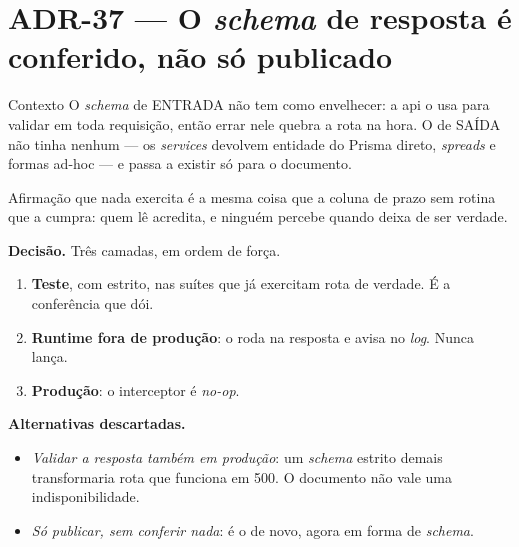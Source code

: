 \section{ADR-37 --- O \emph{schema} de resposta é conferido, não só publicado}
\label{adr:contrato-de-resposta}

\begin{especificacao}{Contexto}
O \emph{schema} de ENTRADA não tem como envelhecer: a api o usa para validar em
toda requisição, então errar nele quebra a rota na hora. O de SAÍDA não tinha
nenhum --- os \emph{services} devolvem entidade do Prisma direto, \emph{spreads}
e formas ad-hoc --- e passa a existir só para o documento.

Afirmação que nada exercita é a mesma coisa que a coluna de prazo sem rotina que
a cumpra: quem lê acredita, e ninguém percebe quando deixa de ser verdade.
\end{especificacao}

\textbf{Decisão.} Três camadas, em ordem de força.

\begin{enumerate}
  \item \textbf{Teste}, com  estrito, nas suítes que já exercitam
    rota de verdade. É a conferência que dói.
  \item \textbf{Runtime fora de produção}: o  roda
     na resposta e avisa no \emph{log}. Nunca lança.
  \item \textbf{Produção}: o interceptor é \emph{no-op}.
\end{enumerate}

\textbf{Alternativas descartadas.}
\begin{itemize}
  \item \emph{Validar a resposta também em produção}: um \emph{schema} estrito
    demais transformaria rota que funciona em 500. O documento não vale uma
    indisponibilidade.
  \item \emph{Só publicar, sem conferir nada}: é o  de novo, agora
    em forma de \emph{schema}.
\end{itemize}


